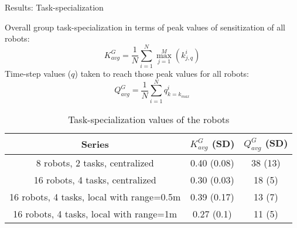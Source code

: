 \documentclass{beamer}
\begin{document}
\begin{frame}[t]{Results: Task-specialization}
\begin{small}
\alert{Overall group task-specialization} in terms of peak values of sensitization of all robots:
\vspace*{-0.25cm}
\begin{equation}
K^G_{avg} = \frac{1}{N}\sum_{i=1}^{N} \max_{j=1}^M\left ( k^i_{j, q} \right ) 
\label{eqn:K-G}
\end{equation}
Time-step values ($q$) taken to reach those peak values for all robots:
\vspace*{-0.25cm}
\begin{equation}
Q^G_{avg}= \frac{1}{N}\sum_{i=1}^{N} q^i_{k=k_{max}}
\label{eqn:Q-G}
\end{equation}
\end{small}
\vspace*{-0.75cm}
\begin{table}
\begin{small}
\begin{center}
\caption{Task-specialization values of the robots}
\begin{tabular}{|c|c|c|}
\hline Series & \textbf{$ K^G_{avg}$} (SD) & \textbf{$ Q^G_{avg}$} (SD) \\ 
\hline \alert{8 robots, 2 tasks, centralized} & \alert{0.40} (0.08)& \alert{38} (13)\\ 
\hline 16 robots, 4 tasks, centralized & 0.30 (0.03) & 18 (5)\\
\hline \alert{16 robots, 4 tasks, local  with range=0.5m}  & \alert{0.39} (0.17) & \alert{13} (7)\\
\hline 16 robots, 4 tasks, local  with range=1m  & 0.27 (0.1) & 11 (5)\\
\hline
\end{tabular}
\label{table:motion-cmp} 
\end{center}
\end{small}
\end{table}
\end{frame}
\end{document}
